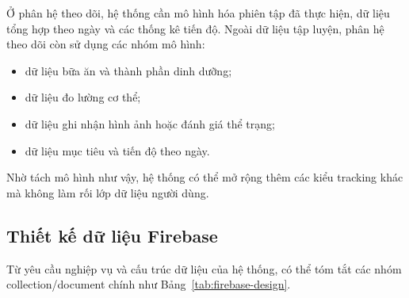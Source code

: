 Ở phân hệ theo dõi, hệ thống cần mô hình hóa phiên tập đã thực hiện, dữ liệu tổng hợp theo ngày và các thống kê tiến độ. Ngoài dữ liệu tập luyện, phân hệ theo dõi còn sử dụng các nhóm mô hình:

\begin{itemize}
    \item dữ liệu bữa ăn và thành phần dinh dưỡng;
    \item dữ liệu đo lường cơ thể;
    \item dữ liệu ghi nhận hình ảnh hoặc đánh giá thể trạng;
    \item dữ liệu mục tiêu và tiến độ theo ngày.
\end{itemize}

Nhờ tách mô hình như vậy, hệ thống có thể mở rộng thêm các kiểu tracking khác mà không làm rối lớp dữ liệu người dùng.

\subsection{Thiết kế dữ liệu Firebase}

Từ yêu cầu nghiệp vụ và cấu trúc dữ liệu của hệ thống, có thể tóm tắt các nhóm collection/document chính như Bảng~\ref{tab:firebase-design}.


